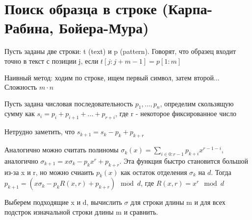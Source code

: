 \documentclass[discrete.tex]{subfiles}
\begin{document}
\section{Поиск образца в строке (Карпа-Рабина, Бойера-Мура)}
\begin{definition}
  Пусть заданы две строки: t (text) и p (pattern). Говорят, что образец входит точно в текст с позиции j, если $t[j:j+m-1] = p[1:m]$
\end{definition}

Наивный метод: ходим по строке, ищем первый символ, затем второй... Сложность $m \cdot n$

\begin{definition}
  Пусть задана числовая последовательность $p_1,...,p_n$, определим скользящую сумму как $s_i=p_i+p_{i+1}+...+p_{r+i}$, где r - некоторое фиксированное число
\end{definition}

\begin{remark}
  Нетрудно заметить, что $s_{k+1} = s_k - p_k + p_{k+r}$
\end{remark}

\begin{remark}
  Аналогично можно считать полиномы $\sigma_k(x) = \sum_{i \in 0 : r-1} p_{k+i} x^{r-1-i}$, аналогично $\sigma_{k+1} = x \sigma_k - p_k x^r + p_{k+r}$. Эта функция быстро становится большой из-за x и r, но можно счиаить $p_k(x)$ как остаток отделения $\sigma_k$ на $d$. Тогда $p_{k+1} = (x \sigma_k - p_k R(x,r) + p_{k+r}) \mod d$, где $R(x,r) = x^r \mod d$
\end{remark}

\begin{alg}
  Выберем подходящие x и d, вычислить $\sigma$ для строки длины m и для всех подстрок изначальной строки длины m и сравнить.
\end{alg}
\end{document}
